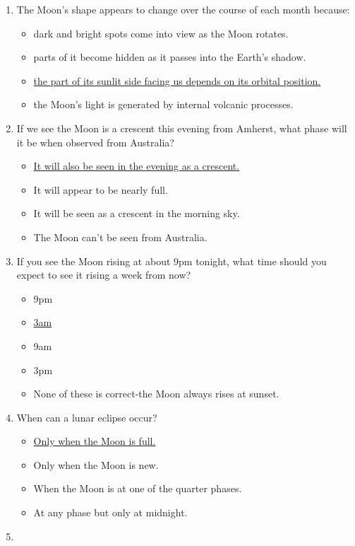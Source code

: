 \documentclass[12pt]{article}
\begin{document}
\begin{enumerate}
\item
The Moon's shape appears to change over the course of each month because:
\begin{itemize}
    \item dark and bright spots come into view as the Moon rotates.
    \item parts of it become hidden as it passes into the Earth's shadow.
    \item \underline{the part of its sunlit side facing us depends on its orbital position.}
    \item the Moon's light is generated by internal volcanic processes.
\end{itemize}
\item
If we see the Moon is a crescent this evening from Amherst, what phase will it be when observed from Australia?
\begin{itemize}
    \item \underline{It will also be seen in the evening as a crescent.}
    \item It will appear to be nearly full.
    \item It will be seen as a crescent in the morning sky.
    \item The Moon can't be seen from Australia.
\end{itemize}
\item
If you see the Moon rising at about 9pm tonight, what time should you expect to see it rising a week from now?
\begin{itemize}
    \item 9pm
    \item \underline{3am}
    \item 9am
    \item 3pm
    \item None of these is correct-the Moon always rises at sunset.
\end{itemize}
\item
When can a lunar eclipse occur?
\begin{itemize}
    \item \underline{Only when the Moon is full.}
    \item Only when the Moon is new.
    \item When the Moon is at one of the quarter phases.
    \item At any phase but only at midnight.
\end{itemize}
\item%

\end{enumerate}
\end{document}
